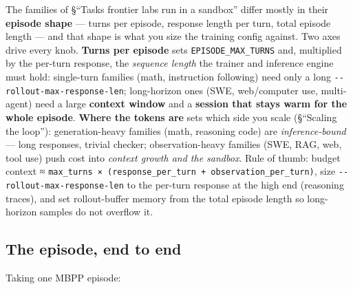 \documentclass[
  paper=a4,
  ,captions=tableheading
]{scrartcl}
\begin{document}
The families of §``Tasks frontier labs run in a sandbox'' differ mostly
in their \textbf{episode shape} --- turns per episode, response length
per turn, total episode length --- and that shape is what you size the
training config against. Two axes drive every knob. \textbf{Turns per
episode} sets \texttt{EPISODE\_MAX\_TURNS} and, multiplied by the
per-turn response, the \emph{sequence length} the trainer and inference
engine must hold: single-turn families (math, instruction following)
need only a long \texttt{-\/-rollout-max-response-len}; long-horizon
ones (SWE, web/computer use, multi-agent) need a large \textbf{context
window} and a \textbf{session that stays warm for the whole episode}.
\textbf{Where the tokens are} sets which side you scale (§``Scaling the
loop''): generation-heavy families (math, reasoning code) are
\emph{inference-bound} --- long responses, trivial checker;
observation-heavy families (SWE, RAG, web, tool use) push cost into
\emph{context growth and the sandbox}. Rule of thumb: budget context ≈
\texttt{max\_turns\ ×\ (response\_per\_turn\ +\ observation\_per\_turn)},
size \texttt{-\/-rollout-max-response-len} to the per-turn response at
the high end (reasoning traces), and set rollout-buffer memory from the
total episode length so long-horizon samples do not overflow it.

\hypertarget{the-episode-end-to-end}{%
\subsection{The episode, end to end}\label{the-episode-end-to-end}}

Taking one MBPP episode:
\end{document}
